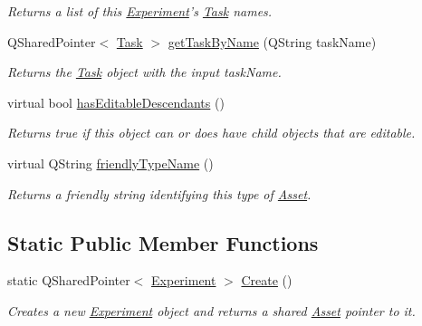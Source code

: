 \begin{DoxyCompactItemize}
\begin{DoxyCompactList}\small\item\em Returns a list of this \hyperlink{class_picto_1_1_experiment}{Experiment}'s \hyperlink{class_picto_1_1_task}{Task} names. \end{DoxyCompactList}\item 
Q\-Shared\-Pointer$<$ \hyperlink{class_picto_1_1_task}{Task} $>$ \hyperlink{class_picto_1_1_experiment_af79bc0fccd19fd675bf9c9492d95501e}{get\-Task\-By\-Name} (Q\-String task\-Name)
\begin{DoxyCompactList}\small\item\em Returns the \hyperlink{class_picto_1_1_task}{Task} object with the input task\-Name. \end{DoxyCompactList}\item 
virtual bool \hyperlink{class_picto_1_1_experiment_a90ea1002f6952278bdce9cc74bf9bc31}{has\-Editable\-Descendants} ()
\begin{DoxyCompactList}\small\item\em Returns true if this object can or does have child objects that are editable. \end{DoxyCompactList}\item 
virtual Q\-String \hyperlink{class_picto_1_1_experiment_a6eda7dedb22f49b65f8dec6af9539850}{friendly\-Type\-Name} ()
\begin{DoxyCompactList}\small\item\em Returns a friendly string identifying this type of \hyperlink{class_picto_1_1_asset}{Asset}. \end{DoxyCompactList}\end{DoxyCompactItemize}
\subsection*{Static Public Member Functions}
\begin{DoxyCompactItemize}
\item 
\hypertarget{class_picto_1_1_experiment_af5187fdba5d861369f9e07c0ff511967}{static Q\-Shared\-Pointer$<$ \hyperlink{class_picto_1_1_experiment}{Experiment} $>$ \hyperlink{class_picto_1_1_experiment_af5187fdba5d861369f9e07c0ff511967}{Create} ()}\label{class_picto_1_1_experiment_af5187fdba5d861369f9e07c0ff511967}

\begin{DoxyCompactList}\small\item\em Creates a new \hyperlink{class_picto_1_1_experiment}{Experiment} object and returns a shared \hyperlink{class_picto_1_1_asset}{Asset} pointer to it. \end{DoxyCompactList}\end{DoxyCompactItemize}
